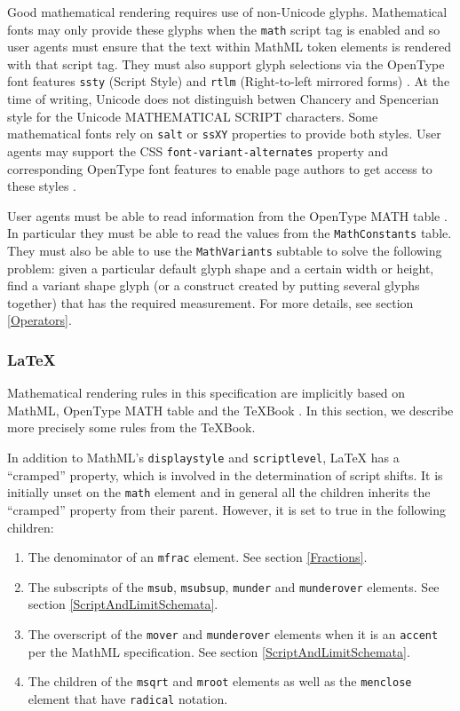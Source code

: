 Good mathematical rendering requires use of non-Unicode glyphs. Mathematical
fonts may only provide these glyphs when the {\tt math}
script tag is enabled and so user agents must ensure that the text within
MathML token
elements is rendered with that script tag. They must also support glyph
selections via the OpenType font features
{\tt ssty} (Script Style)
and {\tt rtlm} (Right-to-left mirrored forms) \cite{OpenFontFormat3}.
At the time of writing, Unicode does not distinguish betwen Chancery and
Spencerian style for the Unicode MATHEMATICAL SCRIPT characters. Some
mathematical fonts rely on {\tt salt} or {\tt ssXY} properties to provide
both styles. User agents may support the CSS {\tt font-variant-alternates}
property and corresponding OpenType font features to enable page authors
to get access to these styles \cite{CSS3Font} \cite{OpenFontFormat3}.

User agents must be able to read information from the
OpenType MATH table \cite{OpenFontFormat3}.
In particular they must be able to read the values from the
{\tt MathConstants} table.
They must also be able to use the {\tt MathVariants} subtable
to solve the following problem: given a particular default glyph shape and a
certain width or height, find a variant shape glyph (or a construct created by
putting several glyphs together) that has the required measurement.
For more details, see section \ref{Operators}.

\subsubsection{LaTeX}\label{LaTeX}

Mathematical rendering rules in this specification are implicitly based on
MathML, OpenType MATH table and the TeXBook
\cite{MathML3} \cite{OpenFontFormat3} \cite{TeXBook}. In this section, we
describe more precisely some rules from the TeXBook.

In addition to MathML's {\tt displaystyle} and {\tt scriptlevel}, LaTeX has
a ``cramped'' property, which is involved in the determination of script shifts.
It is initially unset on the {\tt math} element and in general
all the children inherits the ``cramped'' property from their parent.
However, it is set to true in the following children:

\begin{enumerate}
\item The denominator of an {\tt mfrac} element. See section \ref{Fractions}.
\item The subscripts of the {\tt msub}, {\tt msubsup},
  {\tt munder} and {\tt munderover} elements.
  See section \ref{ScriptAndLimitSchemata}.
\item The overscript of the
  {\tt mover} and {\tt munderover} elements when it is an {\tt accent} per
  the MathML specification. See section \ref{ScriptAndLimitSchemata}.
\item The children of the {\tt msqrt} and {\tt mroot}
  elements as well as the {\tt menclose} element that have {\tt radical}
  notation.
\end{enumerate}

